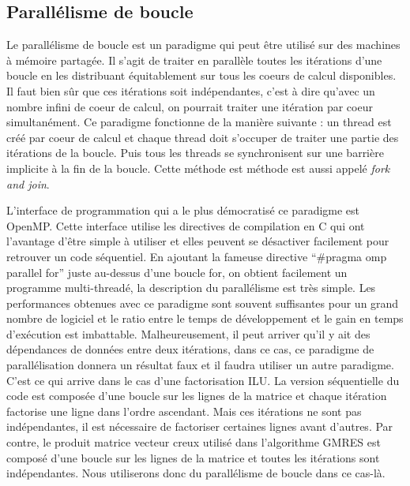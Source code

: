 \subsection{Parallélisme de boucle}
Le parallélisme de boucle est un paradigme qui peut être utilisé sur des machines à mémoire partagée.
%
Il s'agit de traiter en parallèle toutes les itérations d'une boucle en les distribuant équitablement sur tous les coeurs de calcul disponibles.
%
Il faut bien sûr que ces itérations soit indépendantes, c'est à dire qu'avec un nombre infini de coeur de calcul, on pourrait traiter une itération par coeur simultanément.
%
Ce paradigme fonctionne de la manière suivante : un thread est créé par coeur de calcul et chaque thread doit s'occuper de traiter une partie des itérations de la boucle.
%
Puis tous les threads se synchronisent sur une barrière implicite à la fin de la boucle.
%
Cette méthode est méthode est aussi appelé {\em fork and join}.


L'interface de programmation qui a le plus démocratisé ce paradigme est OpenMP.
%
Cette interface utilise les directives de compilation en C qui ont l'avantage d'être simple à utiliser et elles peuvent se désactiver facilement pour retrouver un code séquentiel.
%
En ajoutant la fameuse directive ``\#pragma omp parallel for'' juste au-dessus d'une boucle for, on obtient facilement un programme multi-threadé, la description du parallélisme est très simple.
%
Les performances obtenues avec ce paradigme sont souvent suffisantes pour un grand nombre de logiciel et le ratio entre le temps de développement et le gain en temps d'exécution est imbattable.
%
Malheureusement, il peut arriver qu'il y ait des dépendances de données entre deux itérations, dans ce cas, ce paradigme de parallélisation donnera un résultat faux et il faudra utiliser un autre paradigme.
%
C'est ce qui arrive dans le cas d'une factorisation ILU.
%
La version séquentielle du code est composée d'une boucle sur les lignes de la matrice et chaque itération factorise une ligne dans l'ordre ascendant.
%
Mais ces itérations ne sont pas indépendantes, il est nécessaire de factoriser certaines lignes avant d'autres.
%
Par contre, le produit matrice vecteur creux utilisé dans l'algorithme GMRES est composé d'une boucle sur les lignes de la matrice et toutes les itérations sont indépendantes.
%
Nous utiliserons donc du parallélisme de boucle dans ce cas-là.


